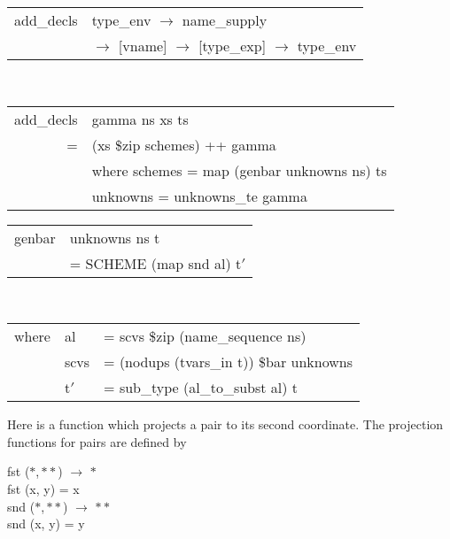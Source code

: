 \begin{mlcoded}
    \begin{tabular}{l@{\hspace{6pt}}l}
        add\_decls \hastype{} &type\_env $\rightarrow$ name\_supply \\
        &$\rightarrow$ [vname] $\rightarrow$ [type\_exp] $\rightarrow$ type\_env
    \end{tabular}\\
    \begin{tabular}{r@{\hspace{4pt}}l}
        add\_decls &gamma ns xs ts \\
        = &(xs \$zip schemes) ++ gamma \\
        &where schemes \hspace{.25cm}= map (genbar unknowns ns) ts \\
        &\hspace{1.25cm}unknowns = unknowns\_te gamma
    \end{tabular}
\end{mlcoded}

\begin{mlcoded}
    \begin{tabular}{r@{\hspace{4pt}}l}
        genbar &unknowns ns t \\
        &= SCHEME (map snd al) t$'$ \\
    \end{tabular}\\
    \begin{tabular}{r@{\hspace{6pt}}l@{\hspace{6pt}}l}
        \hspace*{1.6cm}where &al &= scvs \$zip (name\_sequence ns) \\
        &scvs &= (nodups (tvars\_in t)) \$bar unknowns \\
        &t$'$   &= sub\_type (al\_to\_subst al) t
    \end{tabular}
\end{mlcoded}
Here  is a function which projects a pair to its second coordinate. The
projection functions for pairs are defined by

\begin{mlcoded}
        fst \hastype{} ($\ast$,\,$\ast\ast$) $\rightarrow$ $\ast$ \\
        \vspace{.2cm}fst (x, y) = x\\
        snd \hastype{} ($\ast$,\,$\ast\ast$) $\rightarrow$ $\ast\ast$ \\
        snd (x, y) = y
\end{mlcoded}


